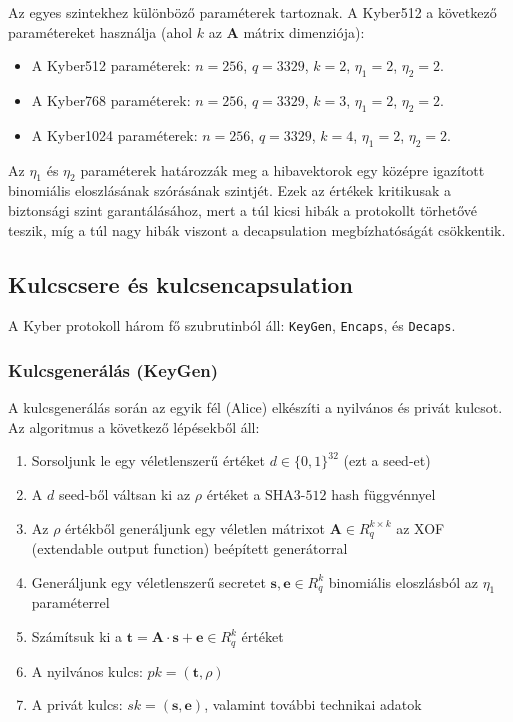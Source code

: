 Az egyes szintekhez különböző paraméterek tartoznak. 
A Kyber512 a következő paramétereket használja (ahol $k$ az $\mathbf{A}$ mátrix dimenziója):
\begin{itemize}
    \item A Kyber512 paraméterek: $n = 256$, $q = 3329$, $k = 2$, $\eta_1 = 2$, $\eta_2 = 2$.   
    \item A Kyber768 paraméterek: $n = 256$, $q = 3329$, $k = 3$, $\eta_1 = 2$, $\eta_2 = 2$. 
    \item A Kyber1024 paraméterek: $n = 256$, $q = 3329$, $k = 4$, $\eta_1 = 2$, $\eta_2 = 2$.
\end{itemize}

Az $\eta_1$ és $\eta_2$ paraméterek határozzák meg a hibavektorok egy középre igazított binomiális 
eloszlásának szórásának szintjét. Ezek az értékek kritikusak a biztonsági szint garantálásához, 
mert a túl kicsi hibák a protokollt törhetővé teszik, míg a túl nagy hibák viszont 
a decapsulation megbízhatóságát csökkentik.

\subsection{Kulcscsere és kulcsencapsulation}

A Kyber protokoll három fő szubrutinból áll: \texttt{KeyGen}, \texttt{Encaps}, és \texttt{Decaps}.

\subsubsection{Kulcsgenerálás (KeyGen)}

A kulcsgenerálás során az egyik fél (Alice) elkészíti a nyilvános és privát kulcsot. Az algoritmus 
a következő lépésekből áll:

\begin{enumerate}
    \item Sorsoljunk le egy véletlenszerű értéket $d \in \{0,1\}^{32}$ (ezt a seed-et)
    \item A $d$ seed-ből váltsan ki az $\rho$ értéket a $\text{SHA3-512}$ hash függvénnyel
    \item Az $\rho$ értékből generáljunk egy véletlen mátrixot $\mathbf{A} \in R_q^{k \times k}$ 
        az XOF (extendable output function) beépített generátorral
    \item Generáljunk egy véletlenszerű secretet $\mathbf{s}, \mathbf{e} \in R_q^k$ binomiális eloszlásból 
        az $\eta_1$ paraméterrel
    \item Számítsuk ki a $\mathbf{t} = \mathbf{A} \cdot \mathbf{s} + \mathbf{e} \in R_q^k$ értéket
    \item A nyilvános kulcs: $pk = (\mathbf{t}, \rho)$
    \item A privát kulcs: $sk = (\mathbf{s}, \mathbf{e})$, valamint további technikai adatok
\end{enumerate}

